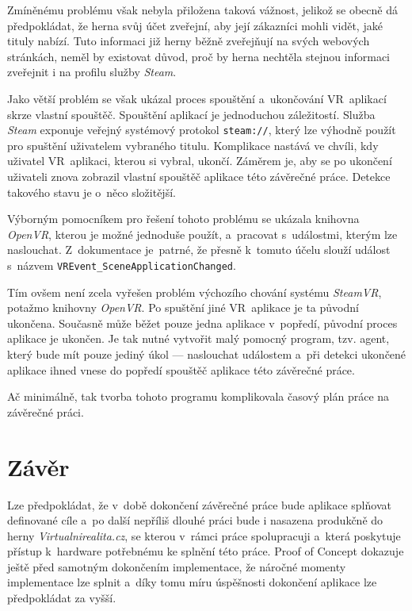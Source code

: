 \documentclass[12pt, a4paper]{article}
\begin{document}
Zmíněnému problému však nebyla přiložena taková vážnost, jelikož se obecně dá předpokládat, že herna svůj účet zveřejní, aby její zákazníci mohli vidět, jaké tituly nabízí. Tuto informaci již herny běžně zveřejňují na svých webových stránkách, neměl by existovat důvod, proč by herna nechtěla stejnou informaci zveřejnit i na profilu služby \textit{Steam}.

Jako větší problém se však ukázal proces spouštění a~ukončování VR~aplikací skrze vlastní spouštěč. Spouštění aplikací je jednoduchou záležitostí. Služba \textit{Steam} exponuje veřejný systémový protokol \texttt{steam://}, který lze výhodně použít pro spuštění uživatelem vybraného titulu.\cite{protocl}
Komplikace nastává ve chvíli, kdy uživatel VR~aplikaci, kterou si vybral, ukončí. Záměrem je, aby se po ukončení uživateli znova zobrazil vlastní spouštěč aplikace této závěrečné práce. Detekce takového stavu je o~něco složitější.

Výborným pomocníkem pro řešení tohoto problému se ukázala knihovna \textit{OpenVR}, kterou je možné jednoduše použít, a~pracovat s~událostmi, kterým lze naslouchat. Z~dokumentace je~patrné, že přesně k~tomuto účelu slouží událost s~názvem \texttt{VREvent\_SceneApplicationChanged}.\cite{openvrapi}

Tím ovšem není zcela vyřešen problém výchozího chování systému \textit{SteamVR}, potažmo knihovny \textit{OpenVR}. Po spuštění jiné VR~aplikace je ta původní ukončena. Současně může běžet pouze jedna aplikace v~popředí, původní proces aplikace je ukončen. Je tak nutné vytvořit malý pomocný program, tzv. agent, který bude mít pouze jediný úkol --- naslouchat událostem a~při detekci ukončené aplikace ihned vnese do popředí spouštěč aplikace této závěrečné práce.

Ač minimálně, tak tvorba tohoto programu komplikovala časový plán práce na závěrečné práci.

\section{Závěr}

Lze předpokládat, že v~době dokončení závěrečné práce bude aplikace splňovat definované cíle a~po další nepříliš dlouhé práci bude i nasazena produkčně do herny \textit{Virtualnirealita.cz}, se kterou v~rámci práce spolupracuji a~která poskytuje přístup k~hardware potřebnému ke splnění této práce. Proof of Concept dokazuje ještě před samotným dokončením implementace, že náročné momenty implementace lze splnit a~díky tomu míru úspěšnosti dokončení aplikace lze předpokládat za vyšší.
\end{document}
